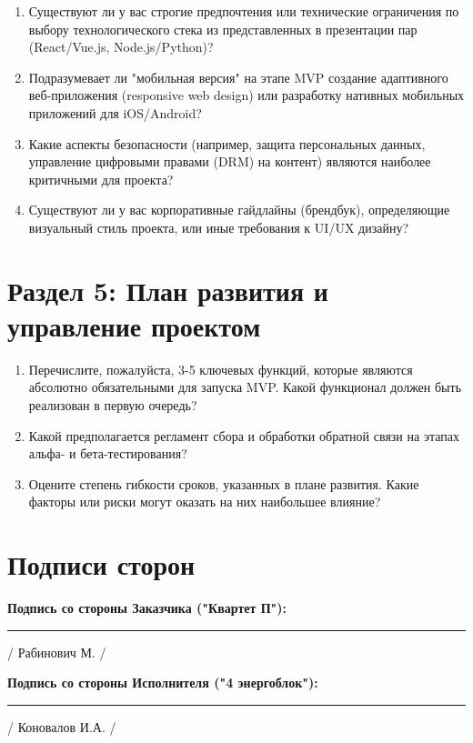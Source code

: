 \documentclass[12pt,a4paper]{article}
\begin{document}
\begin{enumerate}[resume]
    \item Существуют ли у вас строгие предпочтения или технические ограничения по выбору технологического стека из представленных в презентации пар (React/Vue.js, Node.js/Python)?
    
    \item Подразумевает ли "мобильная версия" на этапе MVP создание адаптивного веб-приложения (responsive web design) или разработку нативных мобильных приложений для iOS/Android?
    
    \item Какие аспекты безопасности (например, защита персональных данных, управление цифровыми правами (DRM) на контент) являются наиболее критичными для проекта?
    
    \item Существуют ли у вас корпоративные гайдлайны (брендбук), определяющие визуальный стиль проекта, или иные требования к UI/UX дизайну?
\end{enumerate}

\vspace{1cm}

\section*{Раздел 5: План развития и управление проектом}

\begin{enumerate}[resume]
    \item Перечислите, пожалуйста, 3-5 ключевых функций, которые являются абсолютно обязательными для запуска MVP. Какой функционал должен быть реализован в первую очередь?
    
    \item Какой предполагается регламент сбора и обработки обратной связи на этапах альфа- и бета-тестирования?
    
    \item Оцените степень гибкости сроков, указанных в плане развития. Какие факторы или риски могут оказать на них наибольшее влияние?
\end{enumerate}

\vspace{2cm}

\section*{Подписи сторон}

\textbf{Подпись со стороны Заказчика ("Квартет П"):}

\vspace{2cm}

\rule{5cm}{0.4pt} / Рабинович М. /

\vspace{1cm}

\textbf{Подпись со стороны Исполнителя ("4 энергоблок"):}

\vspace{2cm}

\rule{5cm}{0.4pt} / Коновалов И.А. /
\end{document}
